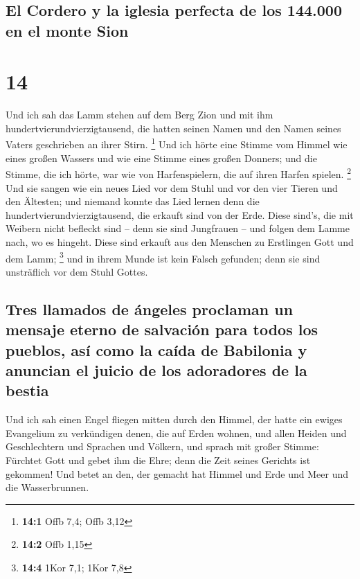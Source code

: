 \hypertarget{el-cordero-y-la-iglesia-perfecta-de-los-144.000-en-el-monte-sion}{%
\subsection{El Cordero y la iglesia perfecta de los 144.000 en el monte
Sion}\label{el-cordero-y-la-iglesia-perfecta-de-los-144.000-en-el-monte-sion}}

\hypertarget{section-13}{%
\section{14}\label{section-13}}

 Und ich sah das Lamm stehen auf dem Berg Zion und mit ihm
hundertvierundvierzigtausend, die hatten seinen Namen und den Namen
seines Vaters geschrieben an ihrer Stirn. \footnote{\textbf{14:1} Offb
  7,4; Offb 3,12}  Und ich hörte eine Stimme vom Himmel
wie eines großen Wassers und wie eine Stimme eines großen Donners; und
die Stimme, die ich hörte, war wie von Harfenspielern, die auf ihren
Harfen spielen. \footnote{\textbf{14:2} Offb 1,15}  Und
sie sangen wie ein neues Lied vor dem Stuhl und vor den vier Tieren und
den Ältesten; und niemand konnte das Lied lernen denn die
hundertvierundvierzigtausend, die erkauft sind von der Erde.
 Diese sind's, die mit Weibern nicht befleckt sind -- denn
sie sind Jungfrauen -- und folgen dem Lamme nach, wo es hingeht. Diese
sind erkauft aus den Menschen zu Erstlingen Gott und dem Lamm;
\footnote{\textbf{14:4} 1Kor 7,1; 1Kor 7,8}  und in ihrem
Munde ist kein Falsch gefunden; denn sie sind unsträflich vor dem Stuhl
Gottes.

\hypertarget{tres-llamados-de-uxe1ngeles-proclaman-un-mensaje-eterno-de-salvaciuxf3n-para-todos-los-pueblos-asuxed-como-la-cauxedda-de-babilonia-y-anuncian-el-juicio-de-los-adoradores-de-la-bestia}{%
\subsection{Tres llamados de ángeles proclaman un mensaje eterno de
salvación para todos los pueblos, así como la caída de Babilonia y
anuncian el juicio de los adoradores de la
bestia}\label{tres-llamados-de-uxe1ngeles-proclaman-un-mensaje-eterno-de-salvaciuxf3n-para-todos-los-pueblos-asuxed-como-la-cauxedda-de-babilonia-y-anuncian-el-juicio-de-los-adoradores-de-la-bestia}}

 Und ich sah einen Engel fliegen mitten durch den Himmel,
der hatte ein ewiges Evangelium zu verkündigen denen, die auf Erden
wohnen, und allen Heiden und Geschlechtern und Sprachen und Völkern,
 und sprach mit großer Stimme: Fürchtet Gott und gebet ihm
die Ehre; denn die Zeit seines Gerichts ist gekommen! Und betet an den,
der gemacht hat Himmel und Erde und Meer und die Wasserbrunnen.


